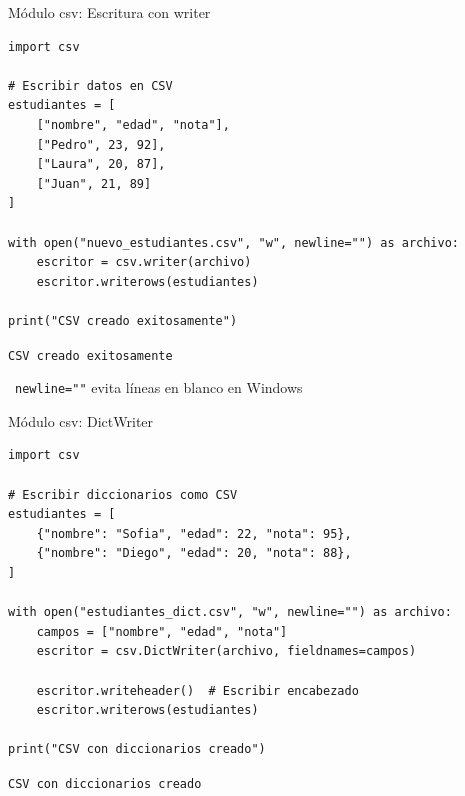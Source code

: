\documentclass{beamer}
\begin{document}
\begin{frame}[fragile]{Módulo csv: Escritura con writer \faPencilAlt}
\begin{lstlisting}
import csv

# Escribir datos en CSV
estudiantes = [
    ["nombre", "edad", "nota"],
    ["Pedro", 23, 92],
    ["Laura", 20, 87],
    ["Juan", 21, 89]
]

with open("nuevo_estudiantes.csv", "w", newline="") as archivo:
    escritor = csv.writer(archivo)
    escritor.writerows(estudiantes)

print("CSV creado exitosamente")
\end{lstlisting}

\vspace{-0.2cm}
\begin{tcolorbox}[colback=green!10,colframe=green,title={\small\faArrowCircleRight \ Salida},coltitle=fg0,left=3pt,right=3pt,top=2pt,bottom=2pt,boxsep=1pt]
\small\texttt{CSV creado exitosamente}
\end{tcolorbox}

\vspace{-0.1cm}
\begin{notebox}
\small\faInfoCircle\ \texttt{newline=""} evita líneas en blanco en Windows
\end{notebox}
\end{frame}

\begin{frame}[fragile]{Módulo csv: DictWriter \faEdit}
\begin{lstlisting}
import csv

# Escribir diccionarios como CSV
estudiantes = [
    {"nombre": "Sofia", "edad": 22, "nota": 95},
    {"nombre": "Diego", "edad": 20, "nota": 88},
]

with open("estudiantes_dict.csv", "w", newline="") as archivo:
    campos = ["nombre", "edad", "nota"]
    escritor = csv.DictWriter(archivo, fieldnames=campos)
    
    escritor.writeheader()  # Escribir encabezado
    escritor.writerows(estudiantes)

print("CSV con diccionarios creado")
\end{lstlisting}

\vspace{-0.2cm}
\begin{tcolorbox}[colback=green!10,colframe=green,title={\small\faArrowCircleRight \ Salida},coltitle=fg0,left=3pt,right=3pt,top=2pt,bottom=2pt,boxsep=1pt]
\small\texttt{CSV con diccionarios creado}
\end{tcolorbox}
\end{frame}
\end{document}
